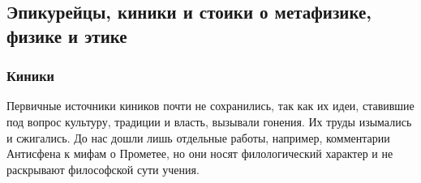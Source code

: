 \subsection{Эпикурейцы, киники и стоики о метафизике, физике и этике}


\subsubsection{Киники}



Первичные источники киников почти не сохранились, так как их идеи, ставившие под вопрос культуру, традиции и власть, вызывали гонения. Их труды изымались и сжигались. До нас дошли лишь отдельные работы, например, комментарии Антисфена к мифам о Прометее, но они носят филологический характер и не раскрывают философской сути учения.


